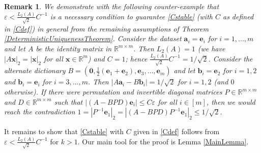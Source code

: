 \documentclass[journal, onecolumn]{IEEEtran}
\newtheorem{remark}{Remark}
\begin{document}
\begin{remark}
We demonstrate with the following counter-example that $\varepsilon < \frac{L_2(A)}{\sqrt{2}}C^{-1}$ is a necessary condition to guarantee \eqref{Cstable} (with $C$ as defined in \eqref{Cdef}) in general from the remaining assumptions of Theorem \ref{DeterministicUniquenessTheorem}. Consider the dataset $\mathbf{a}_i = \mathbf{e}_i$ for $i = 1, \ldots, m$ and let $A$ be the identity matrix in $\mathbb{R}^{m \times m}$. Then $L_2(A) = 1$ (we have $|A\mathbf{x}|_2 = |\mathbf{x}|_2$ for all $\mathbf{x} \in \mathbb{R}^m$) and $C = 1$; hence $\frac{L_2(A)}{\sqrt{2}}C^{-1} = 1/\sqrt{2}$. Consider the alternate dictionary $B = \left(\mathbf{0}, \frac{1}{2}(\mathbf{e}_1 + \mathbf{e}_2), \mathbf{e}_3, \ldots, \mathbf{e}_{m} \right)$ and let $\mathbf{b}_i = \mathbf{e}_2$ for $i = 1, 2$ and $\mathbf{b}_i = \mathbf{e}_i$ for $i = 3, \ldots, m$. Then $|A\mathbf{a}_i - B\mathbf{b}_i| = 1/\sqrt{2}$ for $i = 1, 2$ (and $0$ otherwise). If there were permutation and invertible diagonal matrices $P \in \mathbb{R}^{m \times m}$ and $D \in \mathbb{R}^{m \times m}$ such that $|(A-BPD)\mathbf{e}_i| \leq C\varepsilon$ for all $i \in [m]$, then we would reach the contradiction $1 = |P^{-1}\mathbf{e}_1|_2 = |(A-BPD)P^{-1}\mathbf{e}_1|_2 \leq 1/\sqrt{2}$. 
\end{remark}

It remains to show that \eqref{Cstable} with $C$ given in \eqref{Cdef} follows from $\varepsilon < \frac{L_2(A)}{\sqrt{2}}C^{-1}$ for $k > 1$. Our main tool for the proof is Lemma \ref{MainLemma}.
\end{document}
